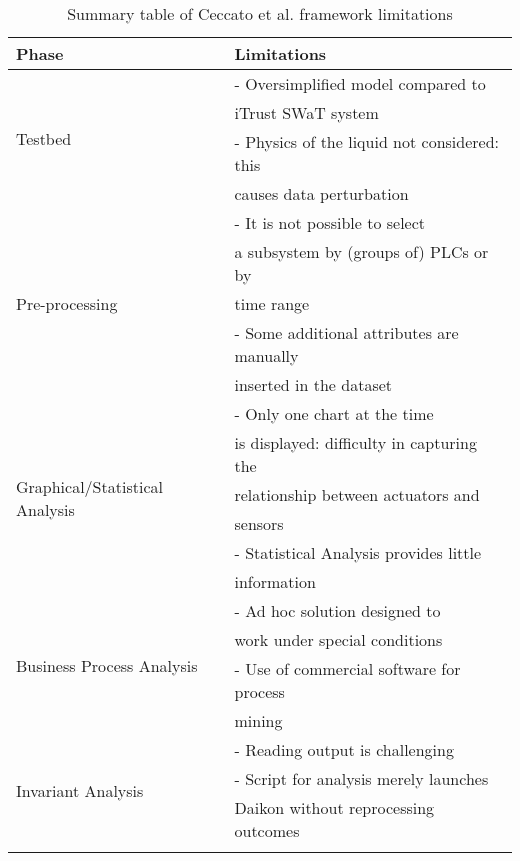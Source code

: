 {\small
\begin{longtable}[c]{| l | l |}
	\hline
	\textbf{Phase} & \textbf{Limitations} \\ [0.5ex] 
	\hline
	\multirow{4}{12em}{Testbed} & - Oversimplified model compared to \\
	& iTrust SWaT system \\
	& - Physics of the liquid not considered: this \\ 
	& causes data perturbation \\
	\hline
	\multirow{5}{12em}{Pre-processing} & - It is not possible to select \\
	& a subsystem by (groups of) PLCs or by \\
	& time range \\
	& - Some additional attributes are manually \\
	& inserted in the dataset \\
	\hline 
	\multirow{6}{12em}{Graphical/Statistical Analysis} & - Only one chart at the time \\
	& is displayed: difficulty in capturing  the \\ 
	& relationship between actuators and \\
	& sensors \\
	& - Statistical Analysis provides little \\ 
	& information \\
	\hline
	\multirow{4}{12em}{Business Process Analysis} & - Ad hoc solution designed to \\
	& work under special conditions \\
	& - Use of commercial software for process \\
	& mining \\
	\hline
	\multirow{3}{12em}{Invariant Analysis} & - Reading output is challenging  \\
	& - Script for analysis merely launches \\
	& Daikon without reprocessing outcomes \\
	\hline
	
	\caption{Summary table of Ceccato et al. framework limitations}
	\label{table:3_ceccato_limitations_table}
\end{longtable}
}
\vfill
\nolinenumbers
